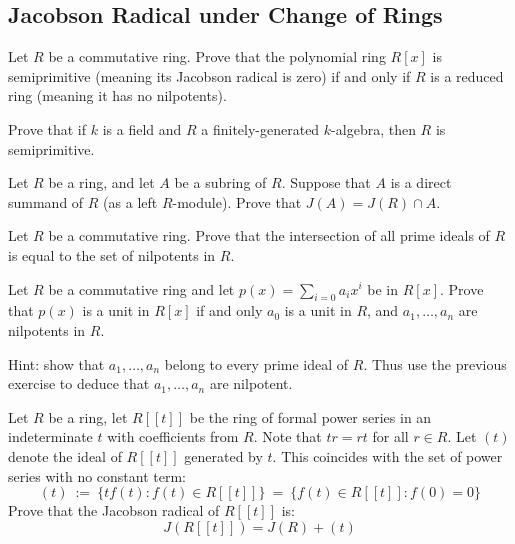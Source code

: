 \subsection{Jacobson Radical under Change of Rings}
\setcounter{subsection}{10}

\begin{exr}[title=Corollary 5.2] %
	Let $R$ be a commutative ring.
	Prove that the polynomial ring $R[x]$ is semiprimitive
	(meaning its Jacobson radical is zero) if and only if $R$ is a
	reduced ring (meaning it has no nilpotents).
\end{exr}


\nq
\begin{exr}[title=Theorem 5.3] %
	Prove that if $k$ is a field and $R$ a finitely-generated $k$-algebra,
	then $R$ is semiprimitive.
\end{exr}


\nq
\begin{exr}[title=Proposition 5.6] %
	Let $R$ be a ring, and let $A$ be a subring of $R$.
	Suppose that $A$ is a direct summand of $R$ (as a left $R$-module).
	Prove that $J(A)=J(R)\cap A$.
\end{exr}


\nq
\begin{exr}
	Let $R$ be a commutative ring.
	Prove that the intersection of all prime ideals of $R$ is equal to %
	the set of nilpotents in $R$.
\end{exr}


\nq
\begin{exr}
	Let $R$ be a commutative ring and let
	$p(x)=\sum_{i=0} a_ix^i$ be in $R[x]$.
	Prove that $p(x)$ is a unit in $R[x]$ if and only $a_0$ is a unit in $R$, %
	and $a_1,\ldots,a_n$ are nilpotents in $R$.

	Hint: show that $a_1,\ldots,a_n$ belong to every prime ideal of $R$.
	Thus use the previous exercise to deduce that $a_1,\ldots,a_n$ are nilpotent.
\end{exr}


\nq
\begin{exr}[title=Exercise 5.6] %
	Let $R$ be a ring, let $R[[t]]$ be the ring of formal power series in
	an indeterminate $t$ with coefficients from $R$.
	Note that $tr=rt$ for all $r\in R$.
	Let $(t)$ denote the ideal of $R[[t]]$ generated by $t$.
	This coincides with the set of power series with no constant term:
	\begin{equation*}
		(t) \ := \ \{tf(t) : f(t)\in R[[t]]\} \ = \ \{f(t)\in R[[t]] : f(0) = 0\}
	\end{equation*}
	Prove that the Jacobson radical of $R[[t]]$ is:
	\begin{equation*}
		J(R[[t]]) = J(R) + (t)
	\end{equation*}
\end{exr}



